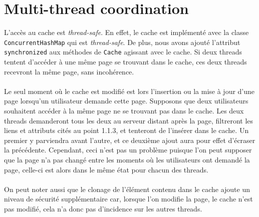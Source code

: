 \documentclass[a4paper,11pt]{article}
\begin{document}
\section{Multi-thread coordination}
L'accès au cache est \textit{thread-safe}. En effet, le cache est implémenté avec la classe \texttt{ConcurrentHashMap} qui est \textit{thread-safe}. De plus, nous avons ajouté l'attribut \texttt{synchronized} aux méthodes de \texttt{Cache} agissant avec le cache. Si deux threads tentent d'accéder à une même page se trouvant dans le cache, ces deux threads recevront la même page, sans incohérence.
\paragraph{}
Le seul moment où le cache est modifié est lors l'insertion ou la mise à jour d'une page lorsqu'un utilisateur demande cette page. Supposons que deux utilisateurs souhaitent accéder à la même page ne se trouvant pas dans le cache. Les deux threads demanderont tous les deux au serveur distant après la page, filtreront les liens et attributs cités au point 1.1.3, et tenteront de l'insérer dans le cache. Un premier y parviendra avant l'autre, et ce deuxième ajout aura pour effet d'écraser la précédente. Cependant, ceci n'est pas un problème puisque l'on peut supposer que la page n'a pas changé entre les moments où les utilisateurs ont demandé la page, celle-ci est alors dans le même état pour chacun des threads.
\paragraph{}
On peut noter aussi que le clonage de l'élément contenu dans le cache ajoute un niveau de sécurité supplémentaire car, lorsque l'on modifie la page, le cache n'est pas modifié, cela n'a donc pas d'incidence sur les autres threads.
\end{document}
